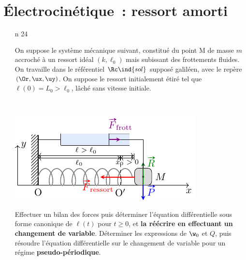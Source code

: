 \documentclass[a4paper, 10pt, final, garamond]{book}
\begin{document}
\setcounter{chapter}{5}


\chapter{Électrocinétique~: ressort amorti}

\vspace{-15pt}
\begin{enumerate}[label=\sqenumi, leftmargin=10pt]
	\item[n]{24}
	      \noindent
	      \begin{minipage}[t]{.65\linewidth}
		      On suppose le système mécanique suivant, constitué du point M de masse
		      $m$ accroché à un ressort idéal $(k,\ell_0)$ mais subissant des
		      frottements fluides. On travaille dans le référentiel $\Rc\ind{sol}$
		      supposé galiléen, avec le repère $(\Or, \ux, \uy)$. On suppose le
		      ressort initialement étiré tel que $\ell(0) = L_0 > \ell_0$, lâché
		      sans vitesse initiale.
	      \end{minipage}
	      \hfill
	      \begin{minipage}[t]{.32\linewidth}
		      ~
		      \vspace{-40pt}
		      \begin{center}
			      \includegraphics[width=\linewidth]{ressort_amorti}
		      \end{center}
	      \end{minipage}
	      Effectuer un bilan des forces puis déterminer l'équation différentielle
	      sous forme canonique de $\ell(t)$ pour $t \geq 0$, et \textbf{la
		      réécrire en effectuant un changement de variable}. Déterminer les
	      expressions de $\w_0$ et $Q$, puis résoudre l'équation différentielle
	      sur le changement de variable pour un régime \textbf{pseudo-périodique}.

\end{enumerate}
\end{document}
